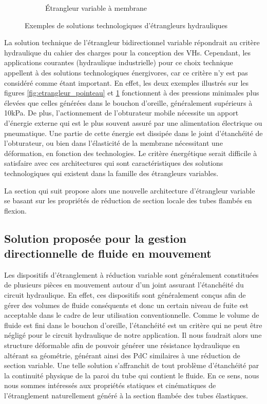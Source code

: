 \begin{figure}[!htbp]
\begin{center}
\begin{subfigure}[t]{0.34\textwidth}
			\caption{Étrangleur variable à membrane}
			\label{fig:etrangleur_membrane}
		\end{subfigure}
		\caption{Exemples de solutions technologiques d'étrangleurs hydrauliques \cite{Maxicours2022,Kenovel2022}}
		\label{fig:etrangleur_techno}
	\end{center}
\end{figure}

La solution technique de l'étrangleur bidirectionnel variable répondrait au critère hydraulique du cahier des charges pour la conception des VHs. Cependant, les applications courantes (hydraulique industrielle) pour ce choix technique appellent à des solutions technologiques énergivores, car ce critère n'y est pas considéré comme étant important. En effet, les deux exemples illustrés sur les figures \ref{fig:etrangleur_pointeau} et \ref{fig:etrangleur_membrane} fonctionnent à des pressions minimales plus élevées que celles générées dans le bouchon d'oreille, généralement supérieurs à 10kPa. De plus, l'actionnement de l'obturateur mobile nécessite un apport d'énergie externe qui est le plus souvent assuré par une alimentation électrique ou pneumatique. Une partie de cette énergie est dissipée dans le joint d'étanchéité de l'obturateur, ou bien dans l'élasticité de la membrane nécessitant une déformation, en fonction des technologies. Le critère énergétique serait difficile à satisfaire avec ces architectures qui sont caractéristiques des solutions technologiques qui existent dans la famille des étrangleurs variables.

La section qui suit propose alors une nouvelle architecture d'étrangleur variable se basant sur les propriétés de réduction de section locale des tubes flambés en flexion.
	\subsection{Solution proposée pour la gestion directionnelle de fluide en mouvement}
	\label{subsec:2.2.3_Solution proposee pour la gestion directionnelle de fluide en mouvement}
Les dispositifs d'étranglement à réduction variable sont généralement constituées de plusieurs pièces en mouvement autour d'un joint assurant l'étanchéité du circuit hydraulique. En effet, ces dispositifs sont généralement conçus afin de gérer des volumes de fluide conséquents et donc un certain niveau de fuite est acceptable dans le cadre de leur utilisation conventionnelle. Comme le volume de fluide est fini dans le bouchon d'oreille, l'étanchéité est un critère qui ne peut être négligé pour le circuit hydraulique de notre application. Il nous faudrait alors une structure déformable afin de pouvoir générer une résistance hydraulique en altérant sa géométrie, générant ainsi des PdC similaires à une réduction de section variable. Une telle solution s'affranchit de tout problème d'étanchéité par la continuité physique de la paroi du tube qui contient le fluide. En ce sens, nous nous sommes intéressés aux propriétés statiques et cinématiques de l'étranglement naturellement généré à la section flambée des tubes élastiques. 

